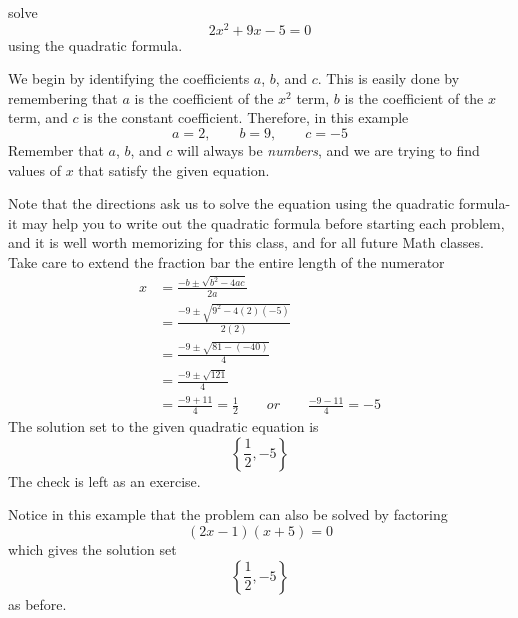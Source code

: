 \begin{myexample}
\Gls{solve}
\[
	2x^2+9x-5=0
\]
using the quadratic formula.
\end{myexample}
\begin{myProof}
	We begin by identifying the coefficients $a$, $b$, and $c$. This is easily done by remembering that $a$ is
	the \gls{coefficient} of the $x^2$ term, $b$ is the coefficient of the $x$ term, and $c$ is the constant coefficient. 
	Therefore, in this example
	\[
		a = 2, \qquad b=9, \qquad c = -5
	\]
	Remember that $a$, $b$, and $c$ will always be {\em numbers}, and we are trying to find values of $x$ that satisfy the 
	given equation.
				
	Note that the directions ask us to solve the equation using the quadratic formula- it may help you to write out the 
	quadratic formula before starting each problem, and it is well worth memorizing for this class, and for all future Math classes. Take care
	to extend the fraction bar the entire length of the numerator
	\begin{align*}
		x & =  \frac{-b\pm \sqrt{b^2-4ac}}{2a}                                     \\
		  & =  \frac{-9\pm\sqrt{9^2-4(2)(-5)}}{2(2)}                               \\
		  & =  \frac{-9\pm \sqrt{81-(-40)}}{4}                                     \\
		  & =  \frac{-9\pm\sqrt{121}}{4}                                           \\
		  & =  \frac{-9+11}{4} = \frac{1}{2} \qquad or\qquad  \frac{-9-11}{4} = -5 
	\end{align*} 
	The solution set to the given quadratic equation is
	\[
		\left\{\frac{1}{2}, -5\right\}
	\]
	The check is left as an exercise.
				
	Notice in this example that the problem can also be solved by factoring
	\[
		(2x-1)(x+5)=0
	\]
	which gives the solution set
	\[
		\left\{\frac{1}{2}, -5\right\}
	\]
	as before.
\end{myProof} 

